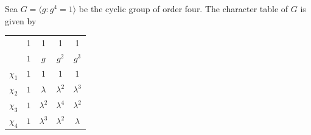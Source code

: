 \begin{example}
	Sea $G=\langle g:g^4=1\rangle$ 
	be the cyclic group of order four. The character table of $G$ is given by
	\begin{center}
		\begin{tabular}{|c|cccc|}
			\hline 
			& 1 & 1 & 1 & 1\tabularnewline
			& $1$ & $g$ & $g^2$ & $g^{3}$\tabularnewline
			\hline 
			$\chi_{1}$ & $1$ & $1$ & $1$ & $1$\tabularnewline
			$\chi_{2}$ & $1$ & $\lambda$ & $\lambda^2$ & $\lambda^{3}$\tabularnewline
			$\chi_{3}$ & $1$ & $\lambda^2$ & $\lambda^4$ & $\lambda^{2}$\tabularnewline
			$\chi_{4}$ & $1$ & $\lambda^{3}$ & $\lambda^{2}$ & $\lambda$\tabularnewline
			\hline
		\end{tabular}
	\end{center}




\end{example}

